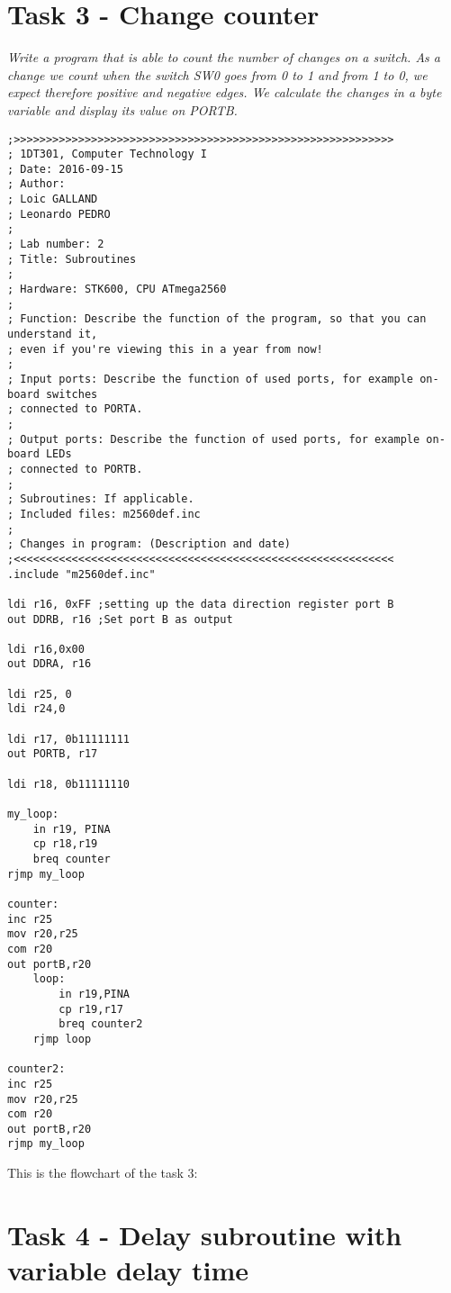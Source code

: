 \documentclass[a4paper,12pt]{article}
\begin{document}
\section{Task 3 - Change counter}
\textit{Write a program that is able to count the number of changes on a switch. As a change we count
when the switch SW0 goes from 0 to 1 and from 1 to 0, we expect therefore positive and negative
edges. We calculate the changes in a byte variable and display its value on PORTB.}

\lstset{style=Asm}
\begin{lstlisting}
;>>>>>>>>>>>>>>>>>>>>>>>>>>>>>>>>>>>>>>>>>>>>>>>>>>>>>>>>>>>
; 1DT301, Computer Technology I
; Date: 2016-09-15
; Author:
; Loic GALLAND
; Leonardo PEDRO
;
; Lab number: 2
; Title: Subroutines
;
; Hardware: STK600, CPU ATmega2560
;
; Function: Describe the function of the program, so that you can understand it,
; even if you're viewing this in a year from now!
;
; Input ports: Describe the function of used ports, for example on-board switches
; connected to PORTA.
;
; Output ports: Describe the function of used ports, for example on-board LEDs
; connected to PORTB.
;
; Subroutines: If applicable.
; Included files: m2560def.inc
;
; Changes in program: (Description and date)
;<<<<<<<<<<<<<<<<<<<<<<<<<<<<<<<<<<<<<<<<<<<<<<<<<<<<<<<<<<<
.include "m2560def.inc"

ldi r16, 0xFF ;setting up the data direction register port B
out DDRB, r16 ;Set port B as output

ldi r16,0x00
out DDRA, r16

ldi r25, 0
ldi r24,0

ldi r17, 0b11111111
out PORTB, r17

ldi r18, 0b11111110

my_loop:
	in r19, PINA
	cp r18,r19
	breq counter
rjmp my_loop

counter:
inc r25
mov r20,r25
com r20
out portB,r20
	loop:
		in r19,PINA
		cp r19,r17
		breq counter2
	rjmp loop

counter2:
inc r25
mov r20,r25
com r20
out portB,r20
rjmp my_loop
\end{lstlisting}

\newpage
This is the flowchart of the task 3:
\begin{center}
\end{center}

\section{Task 4 - Delay subroutine with variable delay time}
\end{document}

